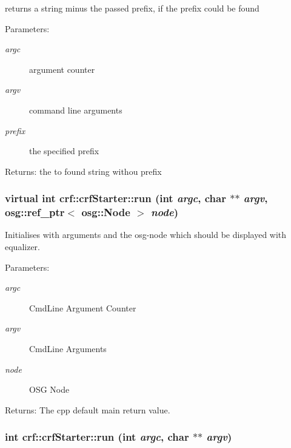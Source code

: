 returns a string minus the passed prefix, if the prefix could be found 

\begin{Desc}
\item[Parameters:]
\begin{description}
\item[{\em argc}]argument counter \item[{\em argv}]command line arguments \item[{\em prefix}]the specified prefix \end{description}
\end{Desc}
\begin{Desc}
\item[Returns:]the to found string withou prefix \end{Desc}
\hypertarget{a00007_20c31de1c50c6504a4aaa617d606715b}{
\subsubsection[{run}]{\setlength{\rightskip}{0pt plus 5cm}virtual int crf::crfStarter::run (int {\em argc}, \/  char $\ast$$\ast$ {\em argv}, \/  osg::ref\_\-ptr$<$ osg::Node $>$ {\em node})}}
\label{a00007_20c31de1c50c6504a4aaa617d606715b}


Initialises with arguments and the osg-node which should be displayed with equalizer. 

\begin{Desc}
\item[Parameters:]
\begin{description}
\item[{\em argc}]CmdLine Argument Counter \item[{\em argv}]CmdLine Arguments \item[{\em node}]OSG Node \end{description}
\end{Desc}
\begin{Desc}
\item[Returns:]The cpp default main return value. \end{Desc}
\hypertarget{a00007_bff219a07f93750e4e6db09fd026de7f}{
\subsubsection[{run}]{\setlength{\rightskip}{0pt plus 5cm}int crf::crfStarter::run (int {\em argc}, \/  char $\ast$$\ast$ {\em argv})}}
\label{a00007_bff219a07f93750e4e6db09fd026de7f}


